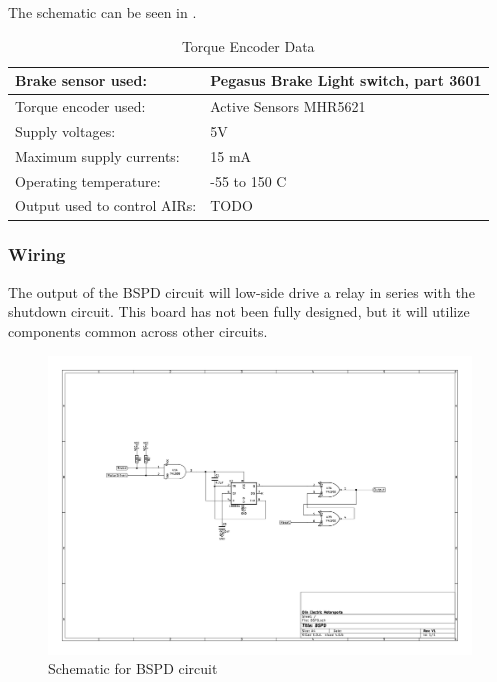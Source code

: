 \documentclass{article}
\begin{document}
The schematic can be seen in . \\

	\begin{table}[H]
	    \centering
	    \begin{tabular}{|l|l|}
	    \hline
	    Brake sensor used: & Pegasus Brake Light switch, part 3601 \\ \hline
	    Torque encoder used: &  Active Sensors MHR5621\\ \hline
	    Supply voltages: & 5V \\ \hline
	    Maximum supply currents: & 15 mA\\ \hline
	    Operating temperature: & -55 to 150 \degree C \\ \hline
	    Output used to control AIRs: & TODO \\ \hline
	    \end{tabular}
	    \caption{Torque Encoder Data}
	    \label{TorqueEncoder1}
	\end{table}


\subsubsection{Wiring}

The output of the BSPD circuit will low-side drive a relay in series with the shutdown circuit. This board has not been fully designed, but it will utilize components common across other circuits.

  \begin{figure}[H]
        \centering
        \includegraphics[width= .75\textheight]{bspd_schematic.png}
        \caption{Schematic for BSPD circuit}
        \label{fig:bspd_schematic}
  \end{figure}
\end{document}
